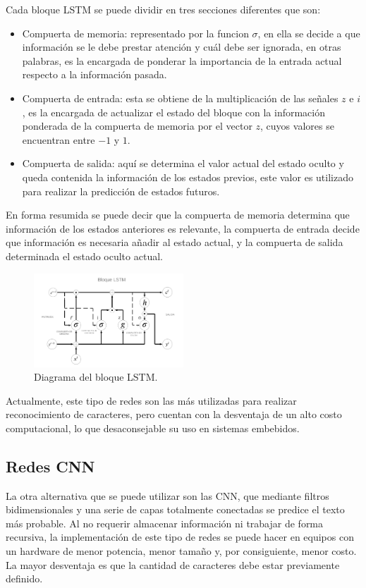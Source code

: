 Cada bloque LSTM se puede dividir en tres secciones diferentes que son:

\begin{itemize}
    \item Compuerta de memoria: representado por la funcion $\sigma$, en ella se decide a que información se le debe prestar atención y cuál debe ser ignorada, en otras palabras, es la encargada de ponderar la importancia de la entrada actual respecto a la información pasada.
    \item Compuerta de entrada: esta se obtiene de la multiplicación de las señales $z$ e $i$, es la encargada de actualizar el estado del bloque con la información ponderada de la compuerta de memoria por el vector $z$, cuyos valores se encuentran entre $-1$ y $1$.
    \item Compuerta de salida: aquí se determina el valor actual del estado oculto y queda contenida la información de los estados previos, este valor es utilizado para realizar la predicción de estados futuros.
\end{itemize}
En forma resumida se puede decir que la compuerta de memoria determina que información de los estados anteriores es relevante, la compuerta de entrada decide que información es necesaria añadir al estado actual, y la compuerta de salida determinada el estado oculto actual.
\begin{figure}[bth]
    \centering
    \includegraphics[width=0.5\textwidth]{imgs/diagrama-lstm.png}
    \caption{Diagrama del bloque LSTM.}
    \label{fig:diagrama-LSTM}
\end{figure}

Actualmente, este tipo de redes son las más utilizadas para realizar reconocimiento de caracteres, pero cuentan con la desventaja de un alto costo computacional, lo que desaconsejable su uso en sistemas embebidos.

\subsection{Redes CNN}

La otra alternativa que se puede utilizar son las CNN, que mediante filtros bidimensionales y una serie de capas totalmente conectadas se predice el texto más probable.
Al no requerir almacenar información ni trabajar de forma recursiva, la implementación
de este tipo de redes se puede hacer en equipos con un hardware de menor potencia, menor tamaño y, por consiguiente, menor costo. La mayor desventaja es que la cantidad de caracteres debe estar previamente definido.

